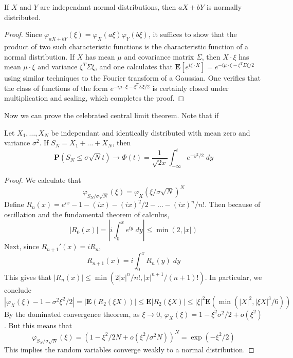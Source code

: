 \begin{theorem}
	If $X$ and $Y$ are independant normal distributions, then $aX + bY$ is normally distributed.
\end{theorem}
\begin{proof}
	Since $\varphi_{aX+bY}(\xi) = \varphi_X(a \xi) \varphi_Y(b \xi)$, it suffices to show that the product of two such characteristic functions is the characteristic function of a normal distribution. If $X$ has mean $\mu$ and covariance matrix $\Sigma$, then $X \cdot \xi$ has mean $\mu \cdot \xi$ and variance $\xi^T \Sigma \xi$, and one calculates that $\mathbf{E}[e^{i \xi \cdot X}] = e^{- i \mu \cdot \xi - \xi^T \Sigma \xi / 2}$ using similar techniques to the Fourier transform of a Gaussian. One verifies that the class of functions of the form $e^{-i \mu \cdot \xi - \xi^T \Sigma \xi / 2}$ is certainly closed under multiplication and scaling, which completes the proof. 
\end{proof}

Now we can prove the celebrated central limit theorem. Note that if

\begin{theorem}
	Let $X_1, \dots, X_N$ be independant and identically distributed with mean zero and variance $\sigma^2$. If $S_N = X_1 + \dots + X_N$, then
	\[ \mathbf{P}(S_N \leq \sigma \sqrt{N} t) \to \Phi(t) = \frac{1}{\sqrt{2x}} \int_{-\infty}^t e^{-y^2/2}\; dy \]
\end{theorem}
\begin{proof}
	We calculate that
	\[ \varphi_{S_N/\sigma \sqrt{N}}(\xi) = \varphi_X(\xi/\sigma \sqrt{N})^N \]
	Define $R_n(x) = e^{ix} - 1 - (ix) - (ix)^2/2 - \dots - (ix)^n/n!$. Then because of oscillation and the fundamental theorem of calculus,
	\[ |R_0(x)| = \left| i \int_0^x e^{iy}\; dy \right| \leq \min(2,|x|) \]
	Next, since $R_{n+1}'(x) = i R_n$,
	\[ R_{n+1}(x) = i  \int_0^x R_n(y)\; dy \]
	This gives that $|R_n(x)| \leq \min(2|x|^n/n!,|x|^{n+1}/(n+1)!)$. In particular, we conclude
	\[ |\varphi_X(\xi) - 1 - \sigma^2 \xi^2/2| = |\mathbf{E}(R_2(\xi X))| \leq \mathbf{E}|R_2(\xi X)| \leq |\xi|^2 \mathbf{E} \left( \min \left( |X|^2, |\xi X|^3/6 \right) \right) \]
	By the dominated convergence theorem, as $\xi \to 0$, $\varphi_X(\xi) = 1 - \xi^2 \sigma^2/2 + o(\xi^2)$. But this means that
	\[ \varphi_{S_N/\sigma \sqrt{N}}(\xi) = (1 - \xi^2 / 2 N + o(\xi^2/\sigma^2 N))^N = \exp(-\xi^2/2) \]
	This implies the random variables converge weakly to a normal distribution.
\end{proof}

